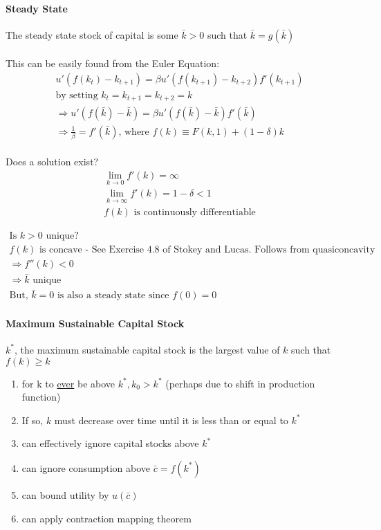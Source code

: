 \documentclass{article}
\begin{document}
\paragraph{Steady State}
{The steady state stock of capital is some $\bar{k}>0$} such that $\bar{k} = g(\bar{k})$
\\
\\
This can be easily found from the Euler Equation:
\\
\[
    \begin{aligned}
    u'(f(k_t) - k_{t+1}) = \beta u'(f(k_{t+1}) - k_{t+2})f'(k_{t+1})\\
    \text{by setting } k_t = k_{t+1} = k_{t+2} = k\\
    \Rightarrow u'(f(\bar{k})-\bar{k}) = \beta u'(f(\bar{k})-\bar{k})f'( \bar{k} )\\
    \Rightarrow \frac{1}{\beta} = f'( \bar{k} ) \text{, where } f(k) \equiv F(k,1) + (1-\delta)k
    \end{aligned}
\]
\\
Does a solution exist?
\\
\[
    \begin{aligned}
    \lim_{k \to 0} f'(k) = \infty \\
    \lim_{k \to \infty} f'(k) = 1 - \delta < 1 \\
    f(k) \text{ is continuously differentiable}
    \end{aligned}
\]

\[
    \begin{aligned}
    \text{Is } k>0 \text{ unique?} \\
    f(k) \text{ is concave - See Exercise 4.8 of Stokey and Lucas. Follows 
    from quasiconcavity and CRS} \\ %
    \Rightarrow f''(k) < 0 \\
    \Rightarrow \bar{k} \text{ unique} \\ 
    \text{But, } \bar{k} = 0 \text{ is also a steady state since } f(0) = 0
    \end{aligned}    
\]


\paragraph[definition]{Maximum Sustainable Capital Stock}
{$k^*$, the maximum sustainable capital stock is the largest
value of $k$ such that $f(k)\geq k$}

\begin{enumerate}
    \item for k to \underline{ever} be above $k^*, k_0 > k^*$ (perhaps due to shift in production function)
    \item If so, $k$ must decrease over time until it is less than or equal to $k^*$
    \item can effectively ignore capital stocks above $k^*$
    \item can ignore consumption above $\bar{c} = f(k^*)$
    \item can bound utility by $u(\bar{c})$
    \item can apply contraction mapping theorem
\end{enumerate}
\end{document}
